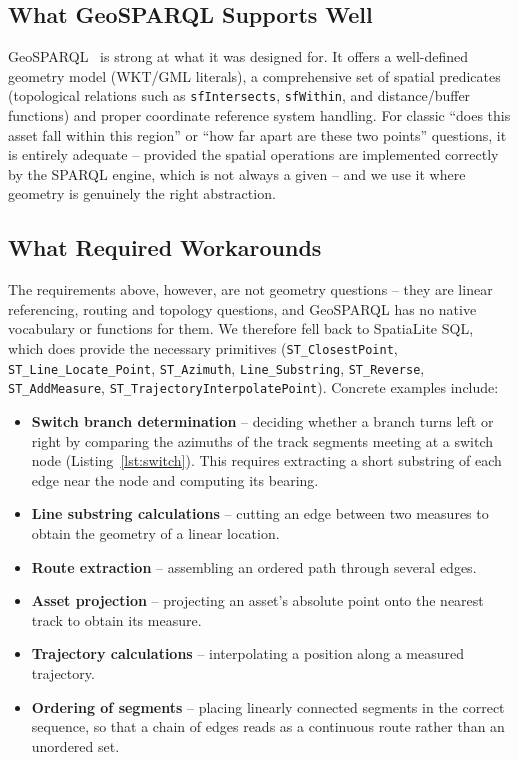 \documentclass{ceurart}
\begin{document}
\subsection{What GeoSPARQL Supports Well}

GeoSPARQL~\cite{geosparql} is strong at what it was designed for. It offers a
well-defined geometry model (WKT/GML literals), a comprehensive set of spatial
predicates (topological relations such as \texttt{sfIntersects},
\texttt{sfWithin}, and distance/buffer functions) and proper coordinate
reference system handling. For classic ``does this asset fall within this
region'' or ``how far apart are these two points'' questions, it is entirely
adequate -- provided the spatial operations are implemented correctly by the
SPARQL engine, which is not always a given -- and we use it where geometry is
genuinely the right abstraction.

\subsection{What Required Workarounds}

The requirements above, however, are not geometry questions -- they are linear
referencing, routing and topology questions, and GeoSPARQL has no native
vocabulary or functions for them. We therefore fell back to SpatiaLite SQL,
which does provide the necessary primitives (\mbox{\texttt{ST\_ClosestPoint}},
\allowbreak\mbox{\texttt{ST\_Line\_Locate\_Point}},
\allowbreak\mbox{\texttt{ST\_Azimuth}},
\allowbreak\mbox{\texttt{Line\_Substring}},
\allowbreak\mbox{\texttt{ST\_Reverse}},
\allowbreak\mbox{\texttt{ST\_AddMeasure}},
\allowbreak\mbox{\texttt{ST\_TrajectoryInterpolatePoint}}). Concrete examples include:

\begin{itemize}
  \item \textbf{Switch branch determination} -- deciding whether a branch turns
        left or right by comparing the azimuths of the track segments meeting at
        a switch node (Listing~\ref{lst:switch}). This requires extracting a
        short substring of each edge near the node and computing its bearing.
  \item \textbf{Line substring calculations} -- cutting an edge between two
        measures to obtain the geometry of a linear location.
  \item \textbf{Route extraction} -- assembling an ordered path through several
        edges.
  \item \textbf{Asset projection} -- projecting an asset's absolute point onto
        the nearest track to obtain its measure.
  \item \textbf{Trajectory calculations} -- interpolating a position along a
        measured trajectory.
  \item \textbf{Ordering of segments} -- placing linearly connected segments in
        the correct sequence, so that a chain of edges reads as a continuous
        route rather than an unordered set.
\end{itemize}
\end{document}
